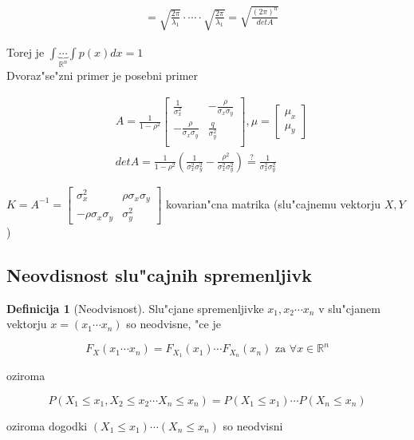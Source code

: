 \documentclass[a4paper,12pt]{article}
\theoremstyle{definition}
\newtheorem{defn}[counter]{Definicija}
\theoremstyle{remark}
\newcommand{\R}{\mathbb{R}}
\begin{document}
\begin{align*}
    &= \sqrt{\frac{2\pi}{\lambda_1}} \cdot \cdots \cdot \sqrt{\frac{2\pi}{\lambda_1}} =
        \sqrt{\frac{(2\pi)^n}{det A}}
\end{align*}

Torej je $\int \underbrace{\cdots}_{\R^n} \int p(x) dx = 1$ \\
Dvoraz"se"zni primer je posebni primer

\begin{align*}
    &A = \frac{1}{1-\rho^2} \begin{bmatrix}
            \frac{1}{\sigma_x^2} & -\frac{\rho}{\sigma_x \sigma_y} \\
            -\frac{\rho}{\sigma_x \sigma_y} & \frac{q}{\sigma_y^2} \\
        \end{bmatrix}, \mu = \begin{bmatrix}
            \mu_x \\
            \mu_y
        \end{bmatrix} \\
    &det A = \frac{1}{1-\rho^2} (\frac{1}{\sigma_x^2 \sigma_y^2} - \frac{\rho^2}{\sigma_x^2 \sigma_y^2})
        \stackrel{\text{?}}{=} \frac{1}{\sigma_x^2 \sigma_y^2}
\end{align*}

$K = A^{-1} = \begin{bmatrix}
    \sigma_x^2 & \rho \sigma_x \sigma_y \\
    -\rho \sigma_x \sigma_y & \sigma_y^2
\end{bmatrix}$ kovarian"cna matrika (slu"cajnemu vektorju $X,Y$)

\subsection{Neovdisnost slu"cajnih spremenljivk}

\begin{defn}[Neodvisnost]
    Slu"cjane spremenljivke $x_1, x_2 \cdots x_n$ v slu"cjanem vektorju $x = (x_1 \cdots x_n)$ so neodvisne,
    "ce je

    \begin{equation*}
        F_X(x_1 \cdots x_n) = F_{X_1}(x_1) \cdots F_{X_n}(x_n) \text{ za } \forall x \in \R^n
    \end{equation*}
    
    oziroma

    \begin{equation*}
        P(X_1 \leq x_1, X_2 \leq x_2 \cdots X_n \leq x_n) = P(X_1 \leq x_1) \cdots P(X_n \leq x_n)
    \end{equation*}

    oziroma dogodki $(X_1 \leq x_1) \cdots (X_n \leq x_n)$ so neodvisni
\end{defn}
\end{document}
